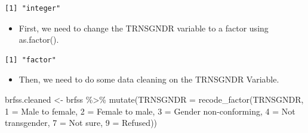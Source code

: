 \documentclass[
  letterpaper,
  DIV=11,
  numbers=noendperiod]{scrreprt}
\newenvironment{Shaded}{\begin{snugshade}}{\end{snugshade}}
\newcommand{\AttributeTok}[1]{\textcolor[rgb]{0.40,0.45,0.13}{#1}}
\newcommand{\CommentTok}[1]{\textcolor[rgb]{0.37,0.37,0.37}{#1}}
\newcommand{\FunctionTok}[1]{\textcolor[rgb]{0.28,0.35,0.67}{#1}}
\newcommand{\NormalTok}[1]{\textcolor[rgb]{0.00,0.23,0.31}{#1}}
\newcommand{\OtherTok}[1]{\textcolor[rgb]{0.00,0.23,0.31}{#1}}
\newcommand{\SpecialCharTok}[1]{\textcolor[rgb]{0.37,0.37,0.37}{#1}}
\newcommand{\StringTok}[1]{\textcolor[rgb]{0.13,0.47,0.30}{#1}}
\providecommand{\tightlist}{%
  \setlength{\itemsep}{0pt}\setlength{\parskip}{0pt}}\usepackage{longtable,booktabs,array}
\begin{document}
\begin{Shaded}
\end{Shaded}

\begin{verbatim}
[1] "integer"
\end{verbatim}

\begin{itemize}
\tightlist
\item
  First, we need to change the TRNSGNDR variable to a factor using
  as.factor().
\end{itemize}

\begin{Shaded}
\end{Shaded}

\begin{verbatim}
[1] "factor"
\end{verbatim}

\begin{itemize}
\tightlist
\item
  Then, we need to do some data cleaning on the TRNSGNDR Variable.
\end{itemize}

\begin{Shaded}
\begin{Highlighting}[]
\NormalTok{brfss.cleaned }\OtherTok{\textless{}{-}}\NormalTok{ brfss }\SpecialCharTok{\%\textgreater{}\%} 
  \FunctionTok{mutate}\NormalTok{(}\AttributeTok{TRNSGNDR =} \FunctionTok{recode\_factor}\NormalTok{(TRNSGNDR,}
      \StringTok{\textquotesingle{}1\textquotesingle{}} \OtherTok{=} \StringTok{\textquotesingle{}Male to female\textquotesingle{}}\NormalTok{,}
      \StringTok{\textquotesingle{}2\textquotesingle{}} \OtherTok{=} \StringTok{\textquotesingle{}Female to male\textquotesingle{}}\NormalTok{,}
      \StringTok{\textquotesingle{}3\textquotesingle{}} \OtherTok{=} \StringTok{\textquotesingle{}Gender non{-}conforming\textquotesingle{}}\NormalTok{,}
      \StringTok{\textquotesingle{}4\textquotesingle{}} \OtherTok{=} \StringTok{\textquotesingle{}Not transgender\textquotesingle{}}\NormalTok{,}
      \StringTok{\textquotesingle{}7\textquotesingle{}} \OtherTok{=} \StringTok{\textquotesingle{}Not sure\textquotesingle{}}\NormalTok{,}
      \StringTok{\textquotesingle{}9\textquotesingle{}} \OtherTok{=} \StringTok{\textquotesingle{}Refused\textquotesingle{}}\NormalTok{))}
\end{Highlighting}
\end{Shaded}
\end{document}
